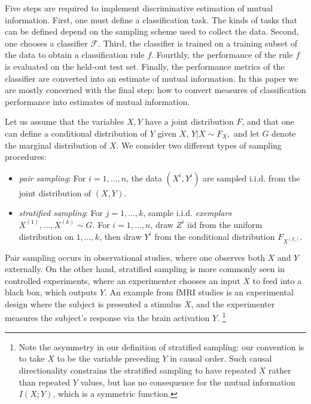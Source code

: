 \documentclass{article}
\begin{document}
Five steps are required to implement discriminative estimation of
mutual information.  First, one must define a classification task.
The kinds of tasks that can be defined depend on the sampling scheme
used to collect the data.  Second, one chooses a classifier
$\mathcal{F}$.  Third, the classifier is trained on a training subset
of the data to obtain a classification rule $f$.  Fourthly, the
performance of the rule $f$ is evaluated on the held-out test set.
Finally, the performance metrics of the classifier are converted into
an estimate of mutual information.  In this paper we are mostly
concerned with the final step: how to convert measures of
classification performance into estimates of mutual information.

Let us assume that the variables $X, Y$ have a joint distribution $F$,
and that one can define a conditional distribution of $Y$ given $X$,
$Y|X \sim F_X,$ and let $G$ denote the marginal distribution of $X$.
We consider two different types of sampling procedures:
\begin{itemize}
\item \emph{pair sampling}: For $i = 1,\hdots, n$, the data $(X^i,
  Y^i)$ are sampled i.i.d. from the joint distribution of $(X, Y)$.
\item \emph{stratified sampling}: For $j = 1,\hdots, k$, sample
  i.i.d. \emph{exemplars} $X^{(1)},\hdots, X^{(k)} \sim G$.  For $i =
  1,\hdots, n$, draw $Z^i$ iid from the uniform distribution on
  $1,\hdots, k$, then draw $Y^i$ from the conditional distribution
  $F_{X^{(Z_i)}}$.
\end{itemize}

Pair sampling occurs in observational studies, where one observes both
$X$ and $Y$ externally.  On the other hand, stratified sampling is
more commonly seen in controlled experiments, where an experimenter
chooses an input $X$ to feed into a black box, which outputs $Y$.  An
example from fMRI studies is an experimental design where the subject
is presented a stimulus $X$, and the experimenter measures the
subject's response via the brain activation $Y$. \footnote{Note the
  asymmetry in our definition of stratified sampling: our convention
  is to take $X$ to be the variable preceding $Y$ in causal order.
  Such causal directionality constrains the stratified sampling to
  have repeated $X$ rather than repeated $Y$ values, but has no
  consequence for the mutual information $I(X; Y)$, which is a
  symmetric function.}
\end{document}
